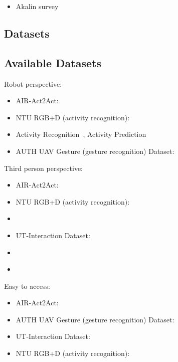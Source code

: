 \documentclass[thesis]{mas_proposal}
\begin{document}
\begin{itemize}
	\item Akalin survey~\cite{akalin2021reinforcement}
\end{itemize}

\subsection{Datasets}
\subsection{Available Datasets}

Robot perspective:
\begin{itemize}
	\item AIR-Act2Act: \cite{Ko2021}
	\item NTU RGB+D (activity recognition): \cite{Liu2020,Shahroudy_2016_CVPR}
	\item Activity Recognition~\cite{ryoo2013firstperson}, Activity Prediction~\cite{ryoo2015robot}
	\item AUTH UAV Gesture (gesture recognition) Dataset:~\cite{patrona2021overview,Liu2020,Perera_2018_ECCV_Workshops}
\end{itemize}

Third person perspective:
\begin{itemize}
	\item AIR-Act2Act: \cite{Ko2021}
	\item NTU RGB+D (activity recognition): \cite{Liu2020}
	\item \cite{Hu2013}
	\item UT-Interaction Dataset: \cite{UT-Interaction-Data}
	\item \cite{Gemeren2016}
	\item \cite{Yun2012}
\end{itemize}

Easy to access:
\begin{itemize}
	\item AIR-Act2Act: \cite{Ko2021}
	\item AUTH UAV Gesture (gesture recognition) Dataset:~\cite{patrona2021overview,Liu2020,Perera_2018_ECCV_Workshops}
	\item UT-Interaction Dataset: \cite{UT-Interaction-Data}
	\item NTU RGB+D (activity recognition): \cite{Liu2020,Shahroudy_2016_CVPR}
\end{itemize}
\end{document}
